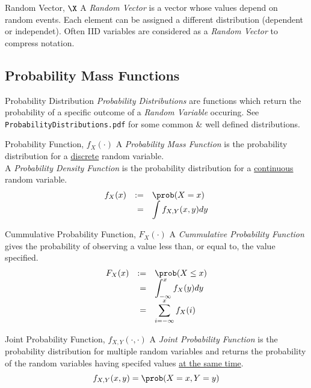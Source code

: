 \documentclass[11pt,a4paper]{article}
\begin{document}
\begin{definition}{Random Vector, $\X$}
A \textit{Random Vector} is a vector whose values depend on random events. Each element can be assigned a different distribution (dependent or independet). Often IID variables are considered as a \textit{Random Vector} to compress notation.
\end{definition}

\subsection{Probability Mass Functions}

\begin{definition}{Probability Distribution}
\textit{Probability Distributions} are functions which return the probability of a specific outcome of a \textit{Random Variable} occuring. See \texttt{ProbabilityDistributions.pdf} for some common \& well defined distributions.
\end{definition}

\begin{definition}{Probability Function, $f_X(\cdot)$}
A \textit{Probability Mass Function} is the probability distribution for a \underline{discrete} random variable.\\
A \textit{Probability Density Function} is the probability distribution for a \underline{continuous} random variable.\\
\[\begin{array}{rrl}
f_X(x)&:=&\prob(X=x)\\
&=&\displaystyle\int f_{X,Y}(x,y)dy
\end{array}\]
\end{definition}

\begin{definition}{Cummulative Probability Function, $F_X(\cdot)$}
A \textit{Cummulative Probability Function} gives the probability of observing a value less than, or equal to, the value specified.
\[\begin{array}{rrl}
F_X(x)&:=&\prob(X\leq x)\\
&=&\displaystyle\int_{-\infty}^xf_X(y)dy\\
&=&\displaystyle\sum_{i=-\infty}^xf_X(i)
\end{array}\]
\end{definition}

\begin{definition}{Joint Probability Function, $f_{X,Y}(\cdot,\cdot)$}
A \textit{Joint Probability Function} is the probability distribution for multiple random variables and returns the probability of the random variables having specifed values \underline{at the same time}.
\[ f_{X,Y}(x,y)=\prob(X=x,Y=y) \]
\end{definition}
\end{document}
